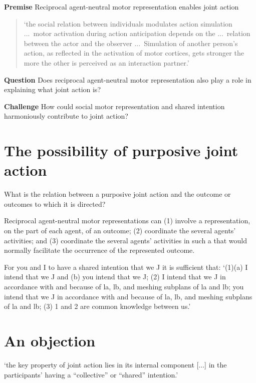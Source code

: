 \documentclass[11pt]{extarticle}
\begin{document}
\begin{multicols}{3}
\textbf{Premise} 
Reciprocal agent-neutral motor representation enables joint action


\begin{quote}
`the social relation between individuals modulates action simulation ...\ motor activation during action anticipation depends on the ...\ relation between the actor and the observer ...\ Simulation of another person’s action, as reﬂected in the activation of motor cortices, gets stronger the more the other is perceived as an interaction partner.’  \citep{kourtis:2010_favoritism}
\end{quote}

\textbf{Question} Does reciprocal agent-neutral motor representation also play a role in explaining what joint action is?  

\textbf{Challenge}  How could social motor representation and shared intention harmoniously contribute to joint action?



\section{The possibility of purposive joint action}
What is the relation between a purposive joint action and the outcome or outcomes to which it is directed?

Reciprocal agent-neutral motor representations can
(1) involve a representation, on the part of each agent, of an outcome; 
(2) coordinate the several agents’ activities;
and 
(3) coordinate the several agents’ activities in such a that would normally facilitate the occurrence of the represented outcome.

For you and I to have a shared intention that we J it is sufficient that: `(1)(a) I intend that we J and (b) you intend that we J; (2) I intend that we J in accordance with and because of la, lb, and meshing subplans of la and lb; you intend that we J in accordance with and because of la, lb, and meshing subplans of la and lb; (3) 1 and 2 are common knowledge between us.'\citep%
{Bratman:1993je}




\section{An objection}
‘the key property of joint action lies in its internal component [...] in the participants’ having a “collective” or “shared” intention.’ \citep[pp.\ 444-5]{alonso_shared_2009}



\end{multicols}
\end{document}
